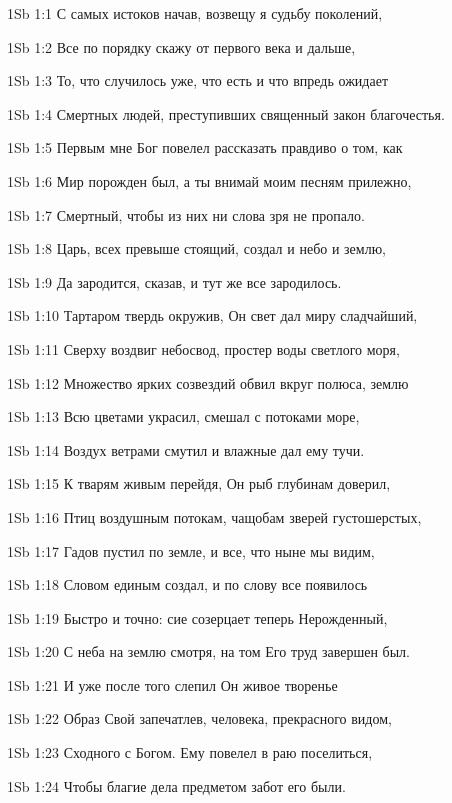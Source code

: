 \vs 1Sb 1:1 С самых истоков начав, возвещу я судьбу поколений,

\vs 1Sb 1:2 Все по порядку скажу от первого века и дальше,

\vs 1Sb 1:3 То, что случилось уже, что есть и что впредь ожидает

\vs 1Sb 1:4 Смертных людей, преступивших священный закон благочестья.

\vs 1Sb 1:5 Первым мне Бог повелел рассказать правдиво о том, как

\vs 1Sb 1:6 Мир порожден был,  а ты внимай моим песням прилежно,

\vs 1Sb 1:7 Смертный, чтобы из них ни слова зря не пропало.

\vs 1Sb 1:8 Царь, всех превыше стоящий, создал и небо и землю,

\vs 1Sb 1:9 Да зародится,  сказав, и тут же все зародилось.

\vs 1Sb 1:10 Тартаром твердь окружив, Он свет дал миру сладчайший,

\vs 1Sb 1:11 Сверху воздвиг небосвод, простер воды светлого моря,

\vs 1Sb 1:12 Множество ярких созвездий обвил вкруг полюса, землю

\vs 1Sb 1:13 Всю цветами украсил, смешал с потоками море,

\vs 1Sb 1:14 Воздух ветрами смутил и влажные дал ему тучи.

\vs 1Sb 1:15 К тварям живым перейдя, Он рыб глубинам доверил,

\vs 1Sb 1:16 Птиц  воздушным потокам, чащобам  зверей густошерстых,

\vs 1Sb 1:17 Гадов пустил по земле, и все, что ныне мы видим,

\vs 1Sb 1:18 Словом единым создал, и по слову все появилось

\vs 1Sb 1:19 Быстро и точно: сие созерцает теперь Нерожденный,

\vs 1Sb 1:20 С неба на землю смотря,  на том Его труд завершен был.

\vs 1Sb 1:21 И уже после того слепил Он живое творенье 

\vs 1Sb 1:22 Образ Свой запечатлев, человека, прекрасного видом,

\vs 1Sb 1:23 Сходного с Богом. Ему повелел в раю поселиться,

\vs 1Sb 1:24 Чтобы благие дела предметом забот его были.


